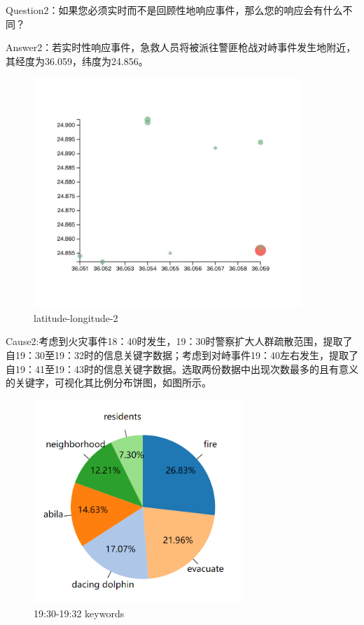 \documentclass[a4paper]{article}
\begin{document}
Question2：如果您必须实时而不是回顾性地响应事件，那么您的响应会有什么不同？

Answer2：若实时性响应事件，急救人员将被派往警匪枪战对峙事件发生地附近，其经度为36.059，纬度为24.856。

\begin{figure}[H]
  \centering
  \includegraphics[width=0.9\textwidth]{images/3-5}
  \caption{latitude-longitude-2}\label{fig:3-5}
  \vspace{\baselineskip}
\end{figure}

Cause2:考虑到火灾事件18：40时发生，19：30时警察扩大人群疏散范围，提取了自19：30至19：32时的信息关键字数据；考虑到对峙事件19：40左右发生，提取了自19：41至19：43时的信息关键字数据。选取两份数据中出现次数最多的且有意义的关键字，可视化其比例分布饼图，如图所示。

\begin{figure}[H]
  \centering
  \includegraphics[width=0.7\textwidth]{images/3-6.png}
  \caption{19:30-19:32 keywords}\label{fig:3-6}
  \vspace{\baselineskip}
\end{figure}
\end{document}
